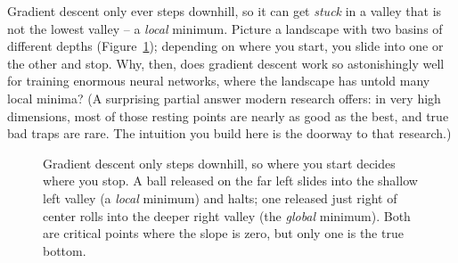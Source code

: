 \begin{walkbox}
Gradient descent only ever steps downhill, so it can get \emph{stuck} in a valley
that is not the lowest valley -- a \emph{local} minimum. Picture a landscape with
two basins of different depths (Figure~\ref{ch33:fig-localmin}); depending on where
you start, you slide into one or the other and stop. Why, then, does gradient descent work so astonishingly well for
training enormous neural networks, where the landscape has untold many local
minima? (A surprising partial answer modern research offers: in very high
dimensions, most of those resting points are nearly as good as the best, and true
bad traps are rare. The intuition you build here is the doorway to that research.)
\end{walkbox}

\begin{figure}[H]
\centering
{}
\caption{Gradient descent only steps downhill, so where you start decides where you
stop. A ball released on the far left slides into the shallow left valley (a
\emph{local} minimum) and halts; one released just right of center rolls into the
deeper right valley (the \emph{global} minimum). Both are critical points where the
slope is zero, but only one is the true bottom.}
\label{ch33:fig-localmin}
\end{figure}

